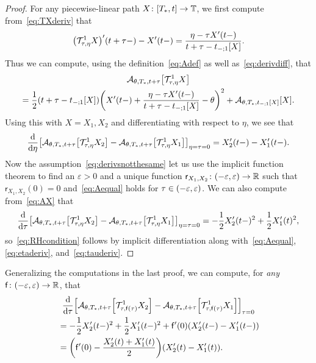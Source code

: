 \documentclass[AHL,Unicode,longabstracts]{cedram}
\newcommand*\sfr{\mathsf{r}}
\newcommand*\sff{\mathsf{f}}
\newcommand*\TT{\mathbb{T}}
\newcommand*\RR{\mathbb{R}}
\newcommand{\clA}{\mathcal{A}}
\newcommand{\clT}{\mathcal{T}}
\newcommand*\dif{\mathrm{d}}
\newcommand*\eps{\varepsilon}
\renewcommand*{\to}{\mathchoice{\longrightarrow}{\rightarrow}{\rightarrow}{\rightarrow}}
\let\oldin\in
\renewcommand{\in}{\mathchoice{\oldin}{\oldin}{\,\oldin\,}{\,\oldin\,}}
\let\originalleft\left
\let\originalright\right
\renewcommand{\left}{\mathopen{}\mathclose\bgroup\originalleft}
\renewcommand{\right}{\aftergroup\egroup\originalright}
\newcommand*\TT{\mathbb{T}}
\newcommand*\RR{\mathbb{R}}
\begin{document}
\begin{proof}
For any piecewise-linear path $X\colon[T_{*},t]\to\TT$, we first compute from~\eqref{eq:TXderiv} that
\begin{equation}\label{eq:derivdiff}
\left(\clT_{\tau,\eta}^{1}X\right)'(t+\tau-)-X'(t-) =\frac{\eta-\tau X'(t-)}{t+\tau-t_{-;1}[X]}.
\end{equation}
Thus we can compute, using the definition~\eqref{eq:Adef} as well as~\eqref{eq:derivdiff}, that
\begin{multline}\label{eq:AX}
\clA_{\theta,T_{*},t+\tau}\left[\clT_{\tau,\eta}^{1}X\right]\\
=\frac{1}{2}(t+\tau-t_{-;1}[X])\left(X'(t-)+\frac{\eta-\tau X'(t-)}{t+\tau-t_{-;1}[X]}-\theta\right)^{2}
+\clA_{\theta,T_{*},t_{-;1}[X]}[X].
\end{multline}
Using this with $X=X_{1},X_{2}$ and differentiating with respect to $\eta$, we see that
\begin{equation}\label{eq:etaderiv}
\frac{\dif}{\dif\eta}\left[\clA_{\theta,T_{*},t+\tau}\left[\clT_{\tau,\eta}^{1}X_{2}\right]-\clA_{\theta,T_{*},t+\tau}\left[\clT_{\tau,\eta}^{1}X_{1}\right]\right]_{\eta=\tau=0}=X_{2}'(t-)-X_{1}'(t-).
\end{equation}
Now the assumption~\eqref{eq:derivsnotthesame} let us use the implicit function theorem to find an $\eps>0$ and a unique function $\sfr_{X_{1},X_{2}}\colon(-\eps,\eps)\to\RR$ such that $\sfr_{X_{1},X_{2}}(0)=0$ and~\eqref{eq:Aequal} holds for $\tau\in(-\eps,\eps)$. We can also compute from~\eqref{eq:AX} that
\begin{equation}\label{eq:tauderiv}
\frac{\dif}{\dif\tau}\left[\clA_{\theta,T_{*},t+\tau}\left[\clT_{\tau,\eta}^{1}X_{2}\right]-\clA_{\theta,T_{*},t+\tau}\left[\clT_{\tau,\eta}^{1}X_{1}\right]\right]_{\eta=\tau=0}=-\frac{1}{2}X_{2}'(t-)^{2}+\frac{1}{2}X_{1}'(t)^{2},
\end{equation}
so~\eqref{eq:RHcondition} follows by implicit differentiation along with~\eqref{eq:Aequal}, \eqref{eq:etaderiv}, and~\eqref{eq:tauderiv}.
\end{proof}

\begin{rema}
Generalizing the computations in the last proof, we can compute, for
\emph{any} $\sff\colon(-\eps,\eps)\to\RR$, that
\begin{multline}\label{eq:generalfderiv}
\frac{\dif}{\dif\tau}  \left[\clA_{\theta,T_{*},t+\tau}\left[\clT_{\tau,\sff(\tau)}^{1}X_{2}\right]-\clA_{\theta,T_{*},t+\tau}\left[\clT_{\tau,\sff(\tau)}^{1}X_{1}\right]\right]_{\tau=0}\\
\begin{aligned}
& =-\frac{1}{2}X_{2}'(t-)^{2}+\frac{1}{2}X_{1}'(t-)^{2}+\sff'(0)\left(X_{2}'(t-)-X_{1}'(t-)\right)\\
& =\left(\sff'(0)-\frac{X_{2}'(t)+X_{1}'(t)}{2}\right)\left(X_{2}'(t)-X_{1}'(t)\right).
\end{aligned}
\end{multline}
\end{rema}
\end{document}
